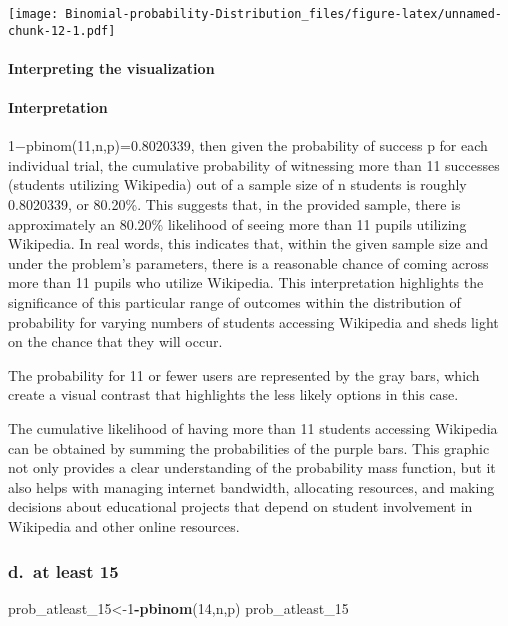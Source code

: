 \documentclass[
]{article}
\newenvironment{Shaded}{\begin{snugshade}}{\end{snugshade}}
\newcommand{\DecValTok}[1]{\textcolor[rgb]{0.00,0.00,0.81}{#1}}
\newcommand{\FunctionTok}[1]{\textcolor[rgb]{0.13,0.29,0.53}{\textbf{#1}}}
\newcommand{\NormalTok}[1]{#1}
\newcommand{\OtherTok}[1]{\textcolor[rgb]{0.56,0.35,0.01}{#1}}
\newcommand{\SpecialCharTok}[1]{\textcolor[rgb]{0.81,0.36,0.00}{\textbf{#1}}}
\begin{document}
\texttt{[image: Binomial-probability-Distribution\_files/figure-latex/unnamed-chunk-12-1.pdf]}

\paragraph{Interpreting the
visualization}\label{interpreting-the-visualization-1}

\paragraph{Interpretation}\label{interpretation-7}

1−pbinom(11,n,p)=0.8020339, then given the probability of success p for
each individual trial, the cumulative probability of witnessing more
than 11 successes (students utilizing Wikipedia) out of a sample size of
n students is roughly 0.8020339, or 80.20\%. This suggests that, in the
provided sample, there is approximately an 80.20\% likelihood of seeing
more than 11 pupils utilizing Wikipedia. In real words, this indicates
that, within the given sample size and under the problem's parameters,
there is a reasonable chance of coming across more than 11 pupils who
utilize Wikipedia. This interpretation highlights the significance of
this particular range of outcomes within the distribution of probability
for varying numbers of students accessing Wikipedia and sheds light on
the chance that they will occur.

The probability for 11 or fewer users are represented by the gray bars,
which create a visual contrast that highlights the less likely options
in this case.

The cumulative likelihood of having more than 11 students accessing
Wikipedia can be obtained by summing the probabilities of the purple
bars. This graphic not only provides a clear understanding of the
probability mass function, but it also helps with managing internet
bandwidth, allocating resources, and making decisions about educational
projects that depend on student involvement in Wikipedia and other
online resources.

\subsubsection{d.~at least 15}\label{d.-at-least-15}

\begin{Shaded}
\begin{Highlighting}[]
\NormalTok{prob\_atleast\_15}\OtherTok{\textless{}{-}}\DecValTok{1}\SpecialCharTok{{-}}\FunctionTok{pbinom}\NormalTok{(}\DecValTok{14}\NormalTok{,n,p)}
\NormalTok{prob\_atleast\_15}
\end{Highlighting}
\end{Shaded}
\end{document}
